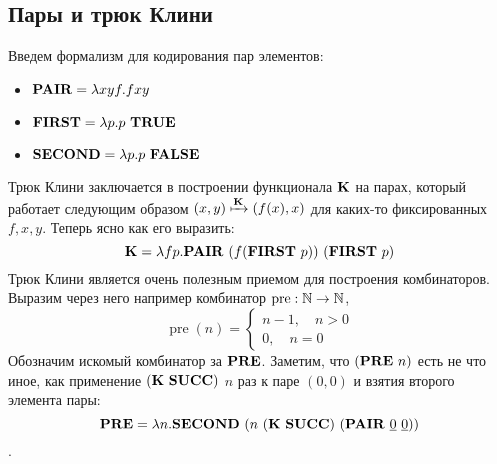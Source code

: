 \subsection{Пары и трюк Клини}
Введем формализм для кодирования пар элементов:
\begin{itemize}
  \item $\combinator{pair} = \lambda x y f . f x y$
  \item $\combinator{first} = \lambda p . p\ \combinator{true}$
  \item $\combinator{second} = \lambda p . p\ \combinator{false}$
\end{itemize}
Трюк Клини заключается в построении  функционала $\combinator{K}$ на парах, который работает следующим образом
$(x,y) \xmapsto{\combinator{K}} (f(x), x)$ для каких-то фиксированных $f, x, y$. Теперь ясно как его выразить:
$$ \combinator{K} = \lambda f p . \combinator{pair}\ (f(\combinator{first}\ p))\ (\combinator{first}\ p)$$
Трюк Клини является очень полезным приемом для построения комбинаторов. Выразим через него например комбинатор
$\operatorname{pre}: \mathbb{N} \to \mathbb{N}$,
$$
  \operatorname{pre}(n) =
  \begin{cases}
    n-1,\quad n > 0 \\
    0,\quad n = 0
  \end{cases}
$$
Обозначим искомый комбинатор за $\combinator{pre}$.
Заметим, что $(\combinator{PRE}\ n)$ есть не что иное, как применение $(\combinator{K}\ \combinator{succ})$ $n$ раз к паре $(0, 0)$ и взятия второго элемента пары:
$$ \combinator{pre} =  \lambda n . \combinator{second}\ (n\ (\combinator{K}\ \combinator{succ})\ (\combinator{pair}\ \numeral{0}\ \numeral{0}))$$.


